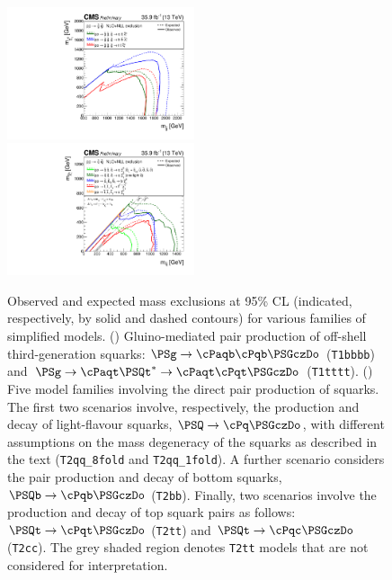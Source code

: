 \begin{figure}[!t]
  \centering
  \includegraphics[width=0.49\textwidth]{Figures/gluinoSUMMARY.pdf}~
  \includegraphics[width=0.49\textwidth]{Figures/squarkSUMMARY.pdf}\\
  \caption{Observed and expected mass exclusions at 95\% CL
    (indicated, respectively, by solid and dashed contours) for
    various families of simplified models. (\cmsLeft) Gluino-mediated
    pair production of off-shell third-generation squarks: $\PSg\to
    \cPaqb\cPqb\PSGczDo$ (\texttt{T1bbbb}) and $\PSg\to
    \cPaqt\PSQt^*\to \cPaqt\cPqt\PSGczDo$ (\texttt{T1tttt}).
    (\cmsRight) Five model families involving the direct pair
    production of squarks. The first two scenarios involve,
    respectively, the production and decay of light-flavour squarks,
    $\PSQ\to \cPq\PSGczDo$, with different assumptions on the mass
    degeneracy of the squarks as described in the text
    (\texttt{T2qq\_8fold} and \texttt{T2qq\_1fold}). A further
    scenario considers the pair production and decay of bottom
    squarks, $\PSQb\to \cPqb\PSGczDo$ (\texttt{T2bb}). Finally, two
    scenarios involve the production and decay of top squark pairs as
    follows: $\PSQt\to \cPqt\PSGczDo$ (\texttt{T2tt}) and $\PSQt\to
    \cPqc\PSGczDo$ (\texttt{T2cc}). The grey shaded region denotes
    \texttt{T2tt} models that are not considered for interpretation.
  }
  \label{fig:limits} 
\end{figure}

